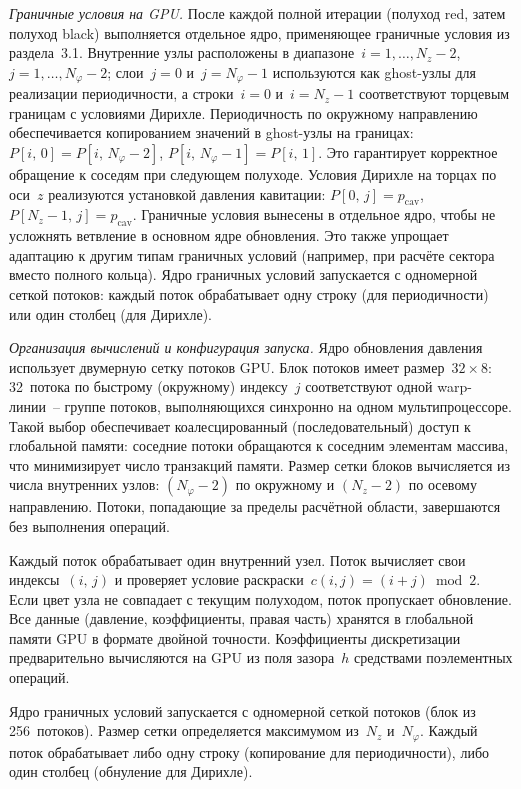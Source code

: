 \textit{Граничные условия на GPU.}
После каждой полной итерации (полуход red, затем полуход black) выполняется отдельное ядро, применяющее граничные условия из раздела~3.1. Внутренние узлы расположены в диапазоне~$i = 1, \ldots, N_z - 2$, $j = 1, \ldots, N_\varphi - 2$; слои~$j = 0$ и~$j = N_\varphi - 1$ используются как ghost-узлы для реализации периодичности, а строки~$i = 0$ и~$i = N_z - 1$ соответствуют торцевым границам с условиями Дирихле. Периодичность по окружному направлению обеспечивается копированием значений в ghost-узлы на границах: $P[i,\,0] = P[i,\,N_\varphi-2]$, $P[i,\,N_\varphi-1] = P[i,\,1]$. Это гарантирует корректное обращение к соседям при следующем полуходе. Условия Дирихле на торцах по оси~$z$ реализуются установкой давления кавитации: $P[0,\,j] = p_{\mathrm{cav}}$, $P[N_z-1,\,j] = p_{\mathrm{cav}}$. Граничные условия вынесены в отдельное ядро, чтобы не усложнять ветвление в основном ядре обновления. Это также упрощает адаптацию к другим типам граничных условий (например, при расчёте сектора вместо полного кольца). Ядро граничных условий запускается с одномерной сеткой потоков: каждый поток обрабатывает одну строку (для периодичности) или один столбец (для Дирихле).

\textit{Организация вычислений и конфигурация запуска.}
Ядро обновления давления использует двумерную сетку потоков GPU. Блок потоков имеет размер~$32 \times 8$: 32~потока по быстрому (окружному) индексу~$j$ соответствуют одной warp-линии~-- группе потоков, выполняющихся синхронно на одном мультипроцессоре. Такой выбор обеспечивает коалесцированный (последовательный) доступ к глобальной памяти: соседние потоки обращаются к соседним элементам массива, что минимизирует число транзакций памяти. Размер сетки блоков вычисляется из числа внутренних узлов: $(N_\varphi - 2)$ по окружному и $(N_z - 2)$ по осевому направлению. Потоки, попадающие за пределы расчётной области, завершаются без выполнения операций.

Каждый поток обрабатывает один внутренний узел. Поток вычисляет свои индексы~$(i,\,j)$ и проверяет условие раскраски~$c(i,j) = (i+j) \bmod 2$. Если цвет узла не совпадает с текущим полуходом, поток пропускает обновление. Все данные (давление, коэффициенты, правая часть) хранятся в глобальной памяти GPU в формате двойной точности. Коэффициенты дискретизации предварительно вычисляются на GPU из поля зазора~$h$ средствами поэлементных операций.

Ядро граничных условий запускается с одномерной сеткой потоков (блок из 256~потоков). Размер сетки определяется максимумом из~$N_z$ и~$N_\varphi$. Каждый поток обрабатывает либо одну строку (копирование для периодичности), либо один столбец (обнуление для Дирихле).

